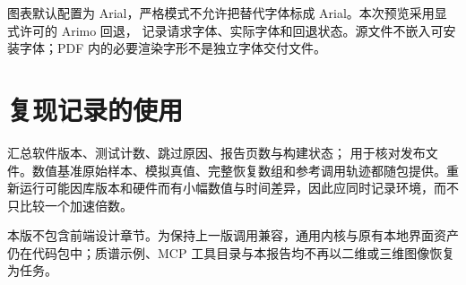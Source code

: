 图表默认配置为 Arial，严格模式不允许把替代字体标成 Arial。本次预览采用显式许可的 Arimo 回退， 记录请求字体、实际字体和回退状态。源文件不嵌入可安装字体；PDF 内的必要渲染字形不是独立字体交付文件。

\section{复现记录的使用}
 汇总软件版本、测试计数、跳过原因、报告页数与构建状态； 用于核对发布文件。数值基准原始样本、模拟真值、完整恢复数组和参考调用轨迹都随包提供。重新运行可能因库版本和硬件而有小幅数值与时间差异，因此应同时记录环境，而不只比较一个加速倍数。

本版不包含前端设计章节。为保持上一版调用兼容，通用内核与原有本地界面资产仍在代码包中；质谱示例、MCP 工具目录与本报告均不再以二维或三维图像恢复为任务。
